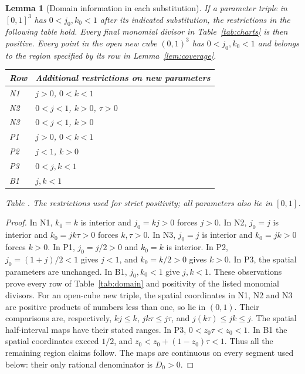 \documentclass[11pt,a4paper]{article}
\newtheorem{lemma}{Lemma}[section]
\theoremstyle{definition}
\begin{document}
\begin{lemma}[Domain information in each substitution]\label{lem:chart-domain}
If a parameter triple in $[0,1]^3$ has $0<j_0,k_0<1$ after its indicated substitution, the restrictions in the following table hold. Every final monomial divisor in Table~\ref{tab:charts} is then positive. Every point in the open new cube $(0,1)^3$ has $0<j_0,k_0<1$ and belongs to the region specified by its row in Lemma~\ref{lem:coverage}.
\begin{center}
\begin{tabular}{@{}ll@{}}
\toprule
Row & Additional restrictions on new parameters\\
\midrule
N1 & $j>0$, $0<k<1$\\
N2 & $0<j<1$, $k>0$, $\tau>0$\\
N3 & $0<j<1$, $k>0$\\
P1 & $j>0$, $0<k<1$\\
P2 & $j<1$, $k>0$\\
P3 & $0<j,k<1$\\
B1 & $j,k<1$\\
\bottomrule
\end{tabular}
\label{tab:domain}\par\smallskip
\small Table \thetable. The restrictions used for strict positivity; all parameters also lie in $[0,1]$.
\end{center}
\end{lemma}
\begin{proof}
In N1, $k_0=k$ is interior and $j_0=kj>0$ forces $j>0$. In N2, $j_0=j$ is interior and $k_0=jk\tau>0$ forces $k,\tau>0$. In N3, $j_0=j$ is interior and $k_0=jk>0$ forces $k>0$. In P1, $j_0=j/2>0$ and $k_0=k$ is interior. In P2, $j_0=(1+j)/2<1$ gives $j<1$, and $k_0=k/2>0$ gives $k>0$. In P3, the spatial parameters are unchanged. In B1, $j_0,k_0<1$ give $j,k<1$. These observations prove every row of Table~\ref{tab:domain} and positivity of the listed monomial divisors.
For an open-cube new triple, the spatial coordinates in N1, N2 and N3 are positive products of numbers less than one, so lie in $(0,1)$. Their comparisons are, respectively, $kj\leq k$, $jk\tau\leq j\tau$, and $j(k\tau)\leq jk\leq j$.
The spatial half-interval maps have their stated ranges. In P3, $0<z_0\tau<z_0<1$. In B1 the spatial coordinates exceed $1/2$, and $z_0<z_0+(1-z_0)\tau<1$. Thus all the remaining region claims follow. The maps are continuous on every segment used below: their only rational denominator is $D_0>0$.
\end{proof}
\end{document}
